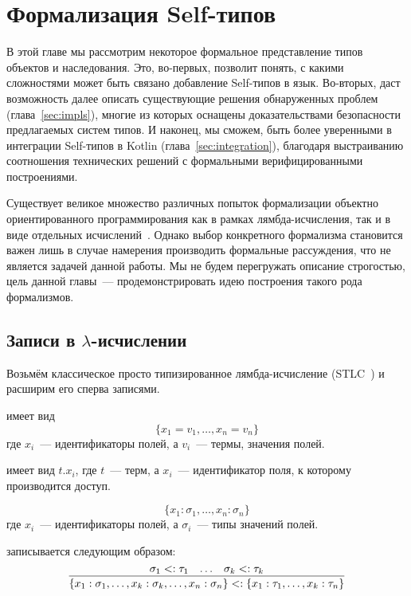 \section{Формализация Self-типов} \label{sec:theory}

В этой главе мы рассмотрим некоторое формальное представление типов объектов и наследования.
Это, во-первых, позволит понять, с какими сложностями может быть связано добавление Self-типов в язык.
Во-вторых, даст возможность далее описать существующие решения обнаруженных проблем (глава~\ref{sec:impls}), многие из которых оснащены доказательствами безопасности предлагаемых систем типов.
И наконец, мы сможем, быть более уверенными в интеграции Self-типов в Kotlin (глава~\ref{sec:integration}), благодаря выстраиванию соотношения технических решений с формальными верифицированными построениями.

Существует великое множество различных попыток формализации объектно ориентированного программирования как в рамках лямбда-исчисления, так и в виде отдельных исчислений~\cite{pierce2002types}.
Однако выбор конкретного формализма становится важен лишь в случае намерения производить формальные рассуждения, что не является задачей данной работы.
Мы не будем перегружать описание строгостью, цель данной главы~--- продемонстрировать идею построения такого рода формализмов.


\subsection{Записи в $\lambda$-исчислении} \label{subsec:records}

Возьмём классическое просто типизированное лямбда-исчисление (STLC~\cite{pierce2002types}) и расширим его сперва записями.

 имеет вид \[\{x_1 = v_1,\ldots,x_n = v_n\}\] где $x_i$~--- идентификаторы полей, а $v_i$~--- термы, значения полей.

 имеет вид $t.x_i$, где $t$~--- терм, а $x_i$~--- идентификатор поля, к которому производится доступ.

 \[\{x_1 : \sigma_1,\ldots,x_n : \sigma_n\}\] где $x_i$~--- идентификаторы полей, а $\sigma_i$~--- типы значений полей.

 записывается следующим образом:
\[
    \infer{
        \{x_1 : \sigma_1, \ldots, x_k : \sigma_k, \ldots, x_n : \sigma_n\}
        <:
        \{x_1 : \tau_1, \ldots, x_k : \tau_n\}
    }{\sigma_1 <: \tau_1 & \ldots & \sigma_k <: \tau_k}
\]


